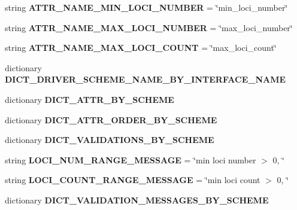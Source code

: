 \begin{DoxyCompactItemize}
\item 
string {\bfseries A\+T\+T\+R\+\_\+\+N\+A\+M\+E\+\_\+\+M\+I\+N\+\_\+\+L\+O\+C\+I\+\_\+\+N\+U\+M\+B\+ER} = \char`\"{}min\+\_\+loci\+\_\+number\char`\"{}\hypertarget{classnegui_1_1pgutilityclasses_1_1NeEstimatorLociSamplingSchemeParameterManager_af01f888e6ee0e7a6753c00ceefe6eed0}{}\label{classnegui_1_1pgutilityclasses_1_1NeEstimatorLociSamplingSchemeParameterManager_af01f888e6ee0e7a6753c00ceefe6eed0}

\item 
string {\bfseries A\+T\+T\+R\+\_\+\+N\+A\+M\+E\+\_\+\+M\+A\+X\+\_\+\+L\+O\+C\+I\+\_\+\+N\+U\+M\+B\+ER} = \char`\"{}max\+\_\+loci\+\_\+number\char`\"{}\hypertarget{classnegui_1_1pgutilityclasses_1_1NeEstimatorLociSamplingSchemeParameterManager_a1c0a249bdc1c57752cef30dc8860fdab}{}\label{classnegui_1_1pgutilityclasses_1_1NeEstimatorLociSamplingSchemeParameterManager_a1c0a249bdc1c57752cef30dc8860fdab}

\item 
string {\bfseries A\+T\+T\+R\+\_\+\+N\+A\+M\+E\+\_\+\+M\+A\+X\+\_\+\+L\+O\+C\+I\+\_\+\+C\+O\+U\+NT} = \char`\"{}max\+\_\+loci\+\_\+count\char`\"{}\hypertarget{classnegui_1_1pgutilityclasses_1_1NeEstimatorLociSamplingSchemeParameterManager_a748460351a6cc6f0d9d0060583ce6df6}{}\label{classnegui_1_1pgutilityclasses_1_1NeEstimatorLociSamplingSchemeParameterManager_a748460351a6cc6f0d9d0060583ce6df6}

\item 
dictionary {\bfseries D\+I\+C\+T\+\_\+\+D\+R\+I\+V\+E\+R\+\_\+\+S\+C\+H\+E\+M\+E\+\_\+\+N\+A\+M\+E\+\_\+\+B\+Y\+\_\+\+I\+N\+T\+E\+R\+F\+A\+C\+E\+\_\+\+N\+A\+ME}
\item 
dictionary {\bfseries D\+I\+C\+T\+\_\+\+A\+T\+T\+R\+\_\+\+B\+Y\+\_\+\+S\+C\+H\+E\+ME}
\item 
dictionary {\bfseries D\+I\+C\+T\+\_\+\+A\+T\+T\+R\+\_\+\+O\+R\+D\+E\+R\+\_\+\+B\+Y\+\_\+\+S\+C\+H\+E\+ME}
\item 
dictionary {\bfseries D\+I\+C\+T\+\_\+\+V\+A\+L\+I\+D\+A\+T\+I\+O\+N\+S\+\_\+\+B\+Y\+\_\+\+S\+C\+H\+E\+ME}
\item 
string {\bfseries L\+O\+C\+I\+\_\+\+N\+U\+M\+\_\+\+R\+A\+N\+G\+E\+\_\+\+M\+E\+S\+S\+A\+GE} = \char`\"{}min loci number $>$ 0, \char`\"{}\hypertarget{classnegui_1_1pgutilityclasses_1_1NeEstimatorLociSamplingSchemeParameterManager_aa36ad24fca1ec9a513bffea12ee8474a}{}\label{classnegui_1_1pgutilityclasses_1_1NeEstimatorLociSamplingSchemeParameterManager_aa36ad24fca1ec9a513bffea12ee8474a}

\item 
string {\bfseries L\+O\+C\+I\+\_\+\+C\+O\+U\+N\+T\+\_\+\+R\+A\+N\+G\+E\+\_\+\+M\+E\+S\+S\+A\+GE} = \char`\"{}min loci count $>$ 0, \char`\"{}\hypertarget{classnegui_1_1pgutilityclasses_1_1NeEstimatorLociSamplingSchemeParameterManager_a6940f85fb5ba2485cda7cb06d40e00be}{}\label{classnegui_1_1pgutilityclasses_1_1NeEstimatorLociSamplingSchemeParameterManager_a6940f85fb5ba2485cda7cb06d40e00be}

\item 
dictionary {\bfseries D\+I\+C\+T\+\_\+\+V\+A\+L\+I\+D\+A\+T\+I\+O\+N\+\_\+\+M\+E\+S\+S\+A\+G\+E\+S\+\_\+\+B\+Y\+\_\+\+S\+C\+H\+E\+ME}
\end{DoxyCompactItemize}


